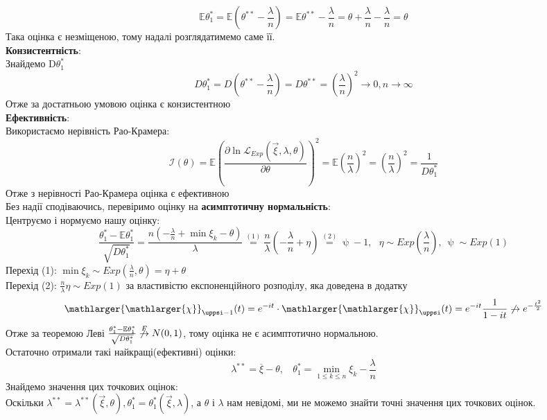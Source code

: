 \documentclass[11 pt]{article}
\begin{document}
$$  
\mathbb{E} \theta^*_1 =
 \mathbb{E}\left( \theta^{**} - \frac{\lambda}{n}\right) =
  \mathbb{E} \theta^{**} - \frac{\lambda}{n} =
  \theta + \frac{\lambda}{n} - \frac{\lambda}{n} = \theta
$$
Така оцінка є незміщеною, тому надалі розглядатимемо саме її. \\ 
\textbf{Конзистентність}: \\ 
Знайдемо D$\theta^*_1$
$$  
D \theta^*_1 = D\left( \theta^{**} - \frac{\lambda}{n}\right) 
= D \theta^{**} =
\left(\frac{\lambda}{n}\right)^2 \longrightarrow 0, n \to \infty
$$ 
Отже за достатньою умовою оцінка є конзистентною \\ 
\textbf{Ефективність}: \\ 
Використаємо нерівність Рао-Крамера:
$$ 
\mathcal{I}(\theta) = \mathbb{E}\left(
    \frac{\partial \ln{\mathcal{L}_{Exp}(\vec{\xi}, \lambda, \theta)}}{\partial \theta}
\right)^2 = \mathbb{E} \left(\frac{n}{\lambda}\right)^2 = \left(\frac{n}{\lambda}\right)^2 =
\frac{1}{D \theta^*_1}
$$ 
Отже з нерівності Рао-Крамера оцінка є ефективною \\ 
Без надії сподіваючись, перевіримо оцінку на \textbf{асимптотичну нормальність}:\\ 
Центруємо і нормуємо нашу оцінку: \\ 
$$ 
 \frac{\theta^*_1 - \mathbb{E} \theta^*_1}{ \sqrt{D \theta^*_1} } = 
 \frac{n(-\frac{\lambda}{n} + \min \xi_k - \theta)}{\lambda} \stackrel{(1)}{=}
 \frac{n}{\lambda}\left(-\frac{\lambda}{n} + \eta \right) \stackrel{(2)}{=}
 \uppsi-1, \ \ \ \eta \sim Exp \left(\frac{\lambda}{n} \right), \ \uppsi \sim Exp(1)
$$
Перехід (1): $\min \xi_k \sim Exp\left( \frac{\lambda}{n}, \theta \right) = \eta + \theta$ \\ 
Перехід (2): $\frac{n}{\lambda} \eta \sim Exp(1)$ за властивістю експоненційного розподілу, яка доведена в додатку 
$$
\mathlarger{\mathlarger{\chi}}_{\uppsi -1}(t) = 
e^{-it} \cdot \mathlarger{\mathlarger{\chi}}_{\uppsi}(t)= 
e^{-it} \frac{1}{1-it} \not\to e^{-\frac{t^2}{2}}
$$ 
Отже за теоремою Леві $\frac{\theta^*_1 - \mathbb{E} \theta^*_1}{ \sqrt{D \theta^*_1} } \not \stackrel{F}{\to} N(0,1)$, тому оцінка не є асимптотично нормальною. \\
Остаточно отримали такі найкращі(ефективні) оцінки:
$$
\lambda^{**} = \overline{\xi} - \theta, \ \ \ \ \theta^*_1 = \min_{1 \le k \le n}\limits \xi_k -\frac{\lambda}{n}
$$
Знайдемо значення цих точкових оцінок: \\ 
Оскільки $\lambda^{**} = \lambda^{**}(\vec{\xi}, \theta), \theta^*_1 = \theta^*_1(\vec{\xi}, \lambda)$,
 а $ \theta$ і $\lambda$ нам невідомі, ми не можемо знайти точні значення цих точкових оцінок. 
\end{document}
